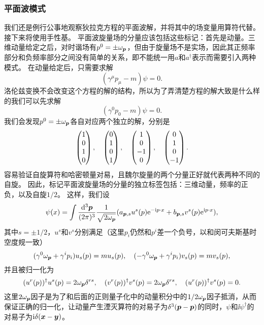 \subsubsection{平面波模式}

我们还是例行公事地观察狄拉克方程的平面波解，并将其中的场变量用算符代替。接下来将使用手性基。
平面波旋量场的分量应该包括这些标记：首先是动量。三维动量给定之后，对时谐场有$p^0 = \pm \omega_{\vb*{p}}$，但由于旋量场不是实场，因此其正频率部分和负频率部分之间没有简单的关系，即不能统一用$a$和$a^\dagger$表示而需要引入两种模式。
在动量给定后，只需要求解
\[
    (\gamma^\mu p_\mu - m) \psi = 0.
\]
洛伦兹变换不会改变这个方程的解的结构，所以为了弄清楚方程的解大致是什么样的我们可以先求解
\[
    (\gamma^0 p_0 - m) \psi = 0.
\]
我们会发现$p^0 = \pm \omega_{\vb*{p}}$各自对应两个独立的解，分别是
\[
    \pmqty{1 \\ 0 \\ 1 \\ 0}, \quad \pmqty{0 \\ 1 \\ 0 \\ 1}, \quad \pmqty{1 \\ 0 \\ -1 \\ 0}, \quad \pmqty{0 \\ 1 \\ 0 \\ -1}.
\]
容易验证自旋算符和哈密顿量对易，且魏尔旋量的两个分量正好就代表两种不同的自旋。
因此，标记平面波旋量场的分量的独立标签包括：三维动量，频率的正负，以及自旋$1/2$。
这样，我们设
\begin{equation}
    \psi(x) = \int \frac{\dd[3]{\vb*{p}}}{(2\pi)^3} \frac{1}{\sqrt{2 \omega_{\vb*{p}}}} (a_{\vb*{p}, s} u^s(p) \mathrm{e}^{-\mathrm{i} p \cdot x} + b_{\vb*{p}, s} v^s(p) \mathrm{e}^{\mathrm{i} p \cdot x}),
\end{equation}
其中$s = \pm 1/2$，$u^s$和$v^s$分别满足（这里$p_i$仍然和$p^i$差一个负号，以和闵可夫斯基时空度规一致）
\begin{equation}
    (\gamma^0 \omega_{\vb*{p}} + \gamma^i p_i) u_s(p) = m u_s(p), \quad (- \gamma^0 \omega_{\vb*{p}} + \gamma^i p_i) v_s(p) = m v_s(p), 
    \label{eq:u-v-eigen}
\end{equation}
并且被归一化为
\begin{equation}
    (u^r(p))^\dagger u^s(p) = 2 \omega_{\vb*{p}} \delta^{rs}, \quad (v^r(p))^\dagger v^s(p) = 2 \omega_{\vb*{p}} \delta^{rs}, \quad (u^r(p))^\dagger v^s(p) = 0.
    \label{eq:dirac-norm}
\end{equation}
这里$2\omega_{\vb*{p}}$因子是为了和后面的正则量子化中的动量积分中的$1/2\omega_{\vb*{p}}$因子抵消，从而保证正确的归一化，让动量产生湮灭算符的对易子为$\delta^3(\vb*{p} - \vb*{p})$的同时，$\psi$和$\ii \psi^\dagger$的对易子为$\mathrm{i} \delta(\vb*{x} - \vb*{y})$。

